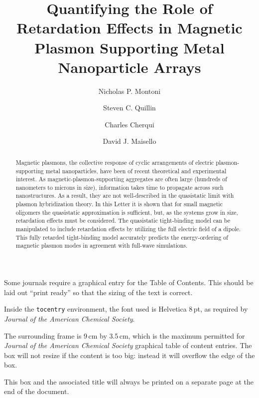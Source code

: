 \documentclass[journal=apchd5,manuscript=article]{achemso}
\author{Nicholas P. Montoni}
\author{Steven C. Quillin}
\author{Charles Cherqui}
\author{David J. Maisello}
\affiliation[Department of Chemistry, University of Washington]
{Department of Chemistry, University of Washington, Seattle, WA 98195}
\title[]
    {Quantifying the Role of Retardation Effects in Magnetic Plasmon Supporting Metal Nanoparticle Arrays}
\begin{document}
\begin{tocentry}

Some journals require a graphical entry for the Table of Contents.
This should be laid out ``print ready'' so that the sizing of the
text is correct.

Inside the \texttt{tocentry} environment, the font used is Helvetica
8\,pt, as required by \emph{Journal of the American Chemical
Society}.

The surrounding frame is 9\,cm by 3.5\,cm, which is the maximum
permitted for  \emph{Journal of the American Chemical Society}
graphical table of content entries. The box will not resize if the
content is too big: instead it will overflow the edge of the box.

This box and the associated title will always be printed on a
separate page at the end of the document.

\end{tocentry}

\begin{abstract}
Magnetic plasmons, the collective response of cyclic arrangements of electric plasmon-supporting metal nanoparticles, have been of recent theoretical and experimental interest. As magnetic-plasmon-supporting aggregates are often large (hundreds of nanometers to microns in size), information takes time to propagate across such nanostructures. As a result, they are not well-described in the quasistatic limit with plasmon hybridization theory. In this Letter it is shown that for small magnetic oligomers the quasistatic approximation is sufficient, but, as the systems grow in size, retardation effects must be considered. The quasistatic tight-binding model can be manipulated to include retardation effects by utilizing the full electric field of a dipole. This fully retarded tight-binding model accurately predicts the energy-ordering of magnetic plasmon modes in agreement with full-wave simulations.
\end{abstract}
\end{document}
